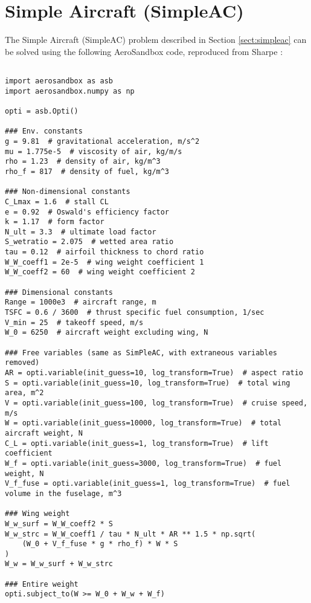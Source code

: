 \newpage
\section{Simple Aircraft (SimpleAC)}
\label{sect:simpleac-code}

The Simple Aircraft (SimpleAC) problem described in Section \ref{sect:simpleac} can be solved using the following AeroSandbox code, reproduced from Sharpe \cite{sharpe_aerosandbox_2021}:

    \begin{verbatim}

import aerosandbox as asb
import aerosandbox.numpy as np

opti = asb.Opti()

### Env. constants
g = 9.81  # gravitational acceleration, m/s^2
mu = 1.775e-5  # viscosity of air, kg/m/s
rho = 1.23  # density of air, kg/m^3
rho_f = 817  # density of fuel, kg/m^3

### Non-dimensional constants
C_Lmax = 1.6  # stall CL
e = 0.92  # Oswald's efficiency factor
k = 1.17  # form factor
N_ult = 3.3  # ultimate load factor
S_wetratio = 2.075  # wetted area ratio
tau = 0.12  # airfoil thickness to chord ratio
W_W_coeff1 = 2e-5  # wing weight coefficient 1
W_W_coeff2 = 60  # wing weight coefficient 2

### Dimensional constants
Range = 1000e3  # aircraft range, m
TSFC = 0.6 / 3600  # thrust specific fuel consumption, 1/sec
V_min = 25  # takeoff speed, m/s
W_0 = 6250  # aircraft weight excluding wing, N

### Free variables (same as SimPleAC, with extraneous variables removed)
AR = opti.variable(init_guess=10, log_transform=True)  # aspect ratio
S = opti.variable(init_guess=10, log_transform=True)  # total wing area, m^2
V = opti.variable(init_guess=100, log_transform=True)  # cruise speed, m/s
W = opti.variable(init_guess=10000, log_transform=True)  # total aircraft weight, N
C_L = opti.variable(init_guess=1, log_transform=True)  # lift coefficient
W_f = opti.variable(init_guess=3000, log_transform=True)  # fuel weight, N
V_f_fuse = opti.variable(init_guess=1, log_transform=True)  # fuel volume in the fuselage, m^3

### Wing weight
W_w_surf = W_W_coeff2 * S
W_w_strc = W_W_coeff1 / tau * N_ult * AR ** 1.5 * np.sqrt(
    (W_0 + V_f_fuse * g * rho_f) * W * S
)
W_w = W_w_surf + W_w_strc

### Entire weight
opti.subject_to(W >= W_0 + W_w + W_f)


\end{verbatim}
